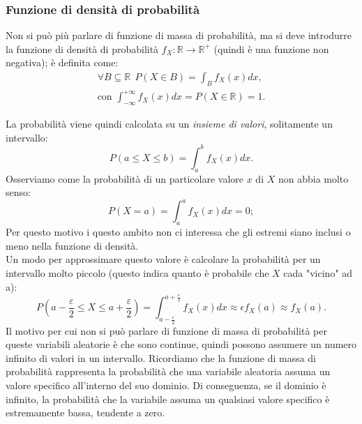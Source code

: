 \subsubsection{Funzione di densità di probabilità}
Non si può più parlare di funzione di massa di probabilità, ma si deve introdurre la funzione di densità di probabilità $f_X : \mathbb R \rightarrow \mathbb R^+$ (quindi è una funzione non negativa); è definita come: \begin{gather*}
\boxed{
\forall B \subseteq \mathbb R \ \: P(X \in B) = \int_B f_X(x) dx}, \\
\text{con } \boxed{\int_{-\infty}^{+\infty} f_X(x) dx = P(X \in \mathbb R) = 1
}.
\end{gather*}

\noindent La probabilità viene quindi calcolata su un \textit{insieme di valori}, solitamente un intervallo: \[
P(a \leq X \leq b) = \int_a^b f_X(x) dx.
\]
\noindent Osserviamo come la probabilità di un particolare valore $x$ di $X$ non abbia molto senso: \[ 
P(X=a) = \int_a^a f_X(x) dx = 0;
\]
Per questo motivo i questo ambito non ci interessa che gli estremi siano inclusi o meno nella funzione di densità. \\
Un modo per approssimare questo valore è calcolare la probabilità per un intervallo molto piccolo (questo indica quanto è probabile che $X$ cada "vicino" ad a): \[
P\left(a - \frac \varepsilon 2 \leq X \leq a + \frac \varepsilon 2\right) = \int_{a-\frac \varepsilon 2}^{a + \frac \varepsilon 2} f_X (x) dx \approx \epsilon f_X(a) \approx f_X(a).
\]
\noindent Il motivo per cui non si può parlare di funzione di massa di probabilità per queste variabili aleatorie è che sono continue, quindi possono assumere un numero infinito di valori in un intervallo. Ricordiamo che la funzione di massa di probabilità rappresenta la probabilità che una variabile aleatoria assuma un valore specifico all'interno del suo dominio. Di conseguenza, se il dominio è infinito, la probabilità che la variabile assuma un qualsiasi valore specifico è estremamente bassa, tendente a zero. \\


